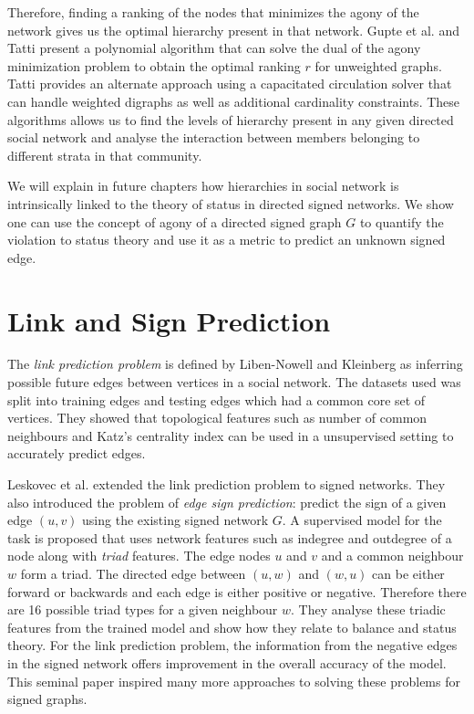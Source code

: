 Therefore, finding a ranking of the nodes that minimizes the agony of the network gives us the optimal hierarchy present in that network. Gupte et al. \cite{gupte2011finding} and Tatti \cite{tatti2014faster} present a polynomial algorithm that can solve the dual of the agony minimization problem to obtain the optimal ranking $r$ for unweighted graphs. Tatti \cite{tatti2017tiers} provides an alternate approach using a capacitated circulation solver that can handle weighted digraphs as well as additional cardinality constraints. These algorithms allows us to find the levels of hierarchy present in any given directed social network and analyse the interaction between members belonging to different strata in that community.

We will explain in future chapters how hierarchies in social network is intrinsically linked to the theory of status in directed signed networks. We show one can use the concept of agony of a directed signed graph $G$ to quantify the violation to status theory and use it as a metric to predict an unknown signed edge.

\section{Link and Sign Prediction}
\label{sec:link-prediction}
The \textit{link prediction problem} is defined by Liben-Nowell and Kleinberg \cite{liben-nowell2007the} as inferring possible future edges between vertices in a social network. The datasets used was split into training edges and testing edges which had a common core set of vertices. They showed that topological features such as number of common neighbours and Katz's centrality index can be used in a unsupervised setting to accurately predict edges.

Leskovec et al. \cite{leskovec2010predicting} extended the link prediction problem to signed networks. They also introduced the problem of \textit{edge sign prediction}: predict the sign of a given edge $(u,v)$ using the existing signed network $G$. A supervised model for the task is proposed that uses network features such as indegree and outdegree of a node along with \textit{triad} features. The edge nodes $u$ and $v$ and a common neighbour $w$ form a triad. The directed edge between $(u,w)$ and $(w,u)$ can be either forward or backwards and each edge is either positive or negative. Therefore there are 16 possible triad types for a given neighbour $w$. They analyse these triadic features from the trained model and show how they relate to balance and status theory. For the link prediction problem, the information from the negative edges in the signed network offers improvement in the overall accuracy of the model. This seminal paper inspired many more approaches to solving these problems for signed graphs.   

